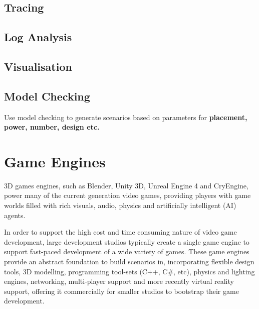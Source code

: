 \subsection{Tracing}
\label{sub:Tracing}

\subsection{Log Analysis}
\label{sub:Log Analysis}

\subsection{Visualisation}
\label{sub:Visualisation}

\subsection{Model Checking}
\label{sub:Model Checking}
Use model checking to generate scenarios based on parameters for \textbf{placement, power, number, design etc.}

\section{Game Engines} %
\label{sec:game_engines}
3D games engines, such as Blender\cite{Blender}, Unity 3D\cite{Unity3D}, Unreal Engine 4\cite{Unreal} and CryEngine\cite{CryEngine}, power many of the current generation video games, providing players with game worlds filled with rich visuals, audio, physics and artificially intelligent (AI) agents.

In order to support the high cost and time consuming nature of video game development, large development studios typically create a single game engine to support fast-paced development of a wide variety of games. These game engines provide an abstract foundation to build scenarios in, incorporating flexible design tools, 3D modelling, programming tool-sets (C++, C\#, etc), physics and lighting engines, networking, multi-player support and more recently virtual reality support, offering it commercially for smaller studios to bootstrap their game development.

